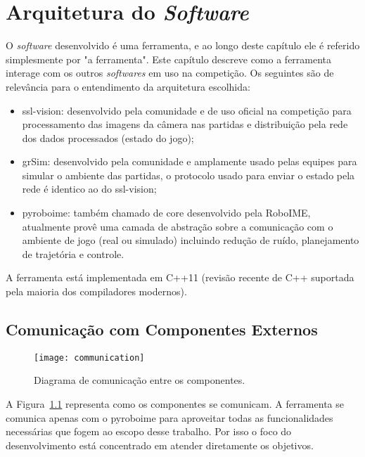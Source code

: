 \chapter{Arquitetura do \textit{Software}}\label{cap:arquitetura}

O \textit{software} desenvolvido é uma ferramenta, e ao longo deste capítulo ele
é referido simplesmente por "a ferramenta".  Este capítulo descreve como a
ferramenta interage com os outros \textit{softwares} em uso na competição.  Os
seguintes são de relevância para o entendimento da arquitetura escolhida:

\begin{itemize}
  \item ssl-vision: desenvolvido pela comunidade e de uso oficial na competição
    para processamento das imagens da câmera nas partidas e distribuição pela
    rede dos dados processados (estado do jogo);
  \item grSim: desenvolvido pela comunidade e amplamente usado pelas equipes
    para simular o ambiente das partidas, o protocolo usado para enviar o estado
    pela rede é identico ao do ssl-vision;
  \item pyroboime: também chamado de core desenvolvido pela RoboIME, atualmente
    provê uma camada de abstração sobre a comunicação com o ambiente de jogo
    (real ou simulado) incluindo redução de ruído, planejamento de trajetória e
    controle.
\end{itemize}


A ferramenta está implementada em C++11 (revisão recente de C++ suportada pela
maioria dos compiladores modernos).

\section{Comunicação com Componentes Externos}

\begin{figure}[H]
  \centering
  \texttt{[image: communication]}
  \caption{Diagrama de comunicação entre os componentes.}\label{fig:arch_comm}
\end{figure}

A Figura~\ref{fig:arch_comm} representa como os componentes se comunicam.  A
ferramenta se comunica apenas com o pyroboime para aproveitar todas as
funcionalidades necessárias que fogem ao escopo desse trabalho.  Por isso o foco
do desenvolvimento está concentrado em atender diretamente os objetivos.


